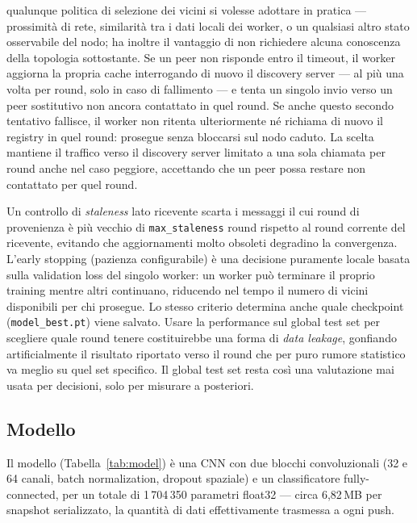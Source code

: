 \begin{itemize}
        qualunque politica di selezione dei vicini si volesse adottare in
        pratica — prossimità di rete, similarità tra i dati locali dei
        worker, o un qualsiasi altro stato osservabile del nodo; ha inoltre il
        vantaggio di non richiedere alcuna conoscenza della topologia
        sottostante. Se un peer non risponde entro
        il timeout, il worker aggiorna la propria cache interrogando di nuovo
        il discovery server — al più una volta per round, solo in caso di
        fallimento — e tenta un singolo invio verso un peer sostitutivo non
        ancora contattato in quel round. Se anche questo secondo tentativo
        fallisce, il worker non ritenta ulteriormente né richiama di nuovo il
        registry in quel round: prosegue senza bloccarsi sul nodo caduto. La
        scelta mantiene il traffico verso
        il discovery server limitato a una sola chiamata per round anche nel
        caso peggiore, accettando che un peer possa restare non contattato
        per quel round.
\end{itemize}

Un controllo di \emph{staleness} lato ricevente scarta i messaggi il cui
round di provenienza è più vecchio di \texttt{max\_staleness} round rispetto
al round corrente del ricevente, evitando che aggiornamenti molto obsoleti
degradino la convergenza. L'early stopping (pazienza configurabile) è una
decisione puramente locale basata sulla validation loss del singolo worker:
un worker può terminare il proprio training mentre altri continuano,
riducendo nel tempo il numero di vicini disponibili per chi prosegue. Lo
stesso criterio determina anche quale checkpoint (\texttt{model\_best.pt}) viene salvato.
Usare la performance sul global test set per scegliere quale round tenere
costituirebbe una forma di \emph{data leakage}, gonfiando artificialmente il risultato riportato
verso il round che per puro rumore statistico va meglio su quel set
specifico. Il global test set resta così una valutazione mai usata
per decisioni, solo per misurare a posteriori.

\subsection{Modello}
Il modello (Tabella~\ref{tab:model}) è una CNN
con due blocchi convoluzionali (32 e 64 canali, batch normalization, dropout
spaziale) e un classificatore fully-connected, per un totale di 1\,704\,350
parametri float32 — circa 6,82\,MB per snapshot serializzato, la quantità di
dati effettivamente trasmessa a ogni push.

